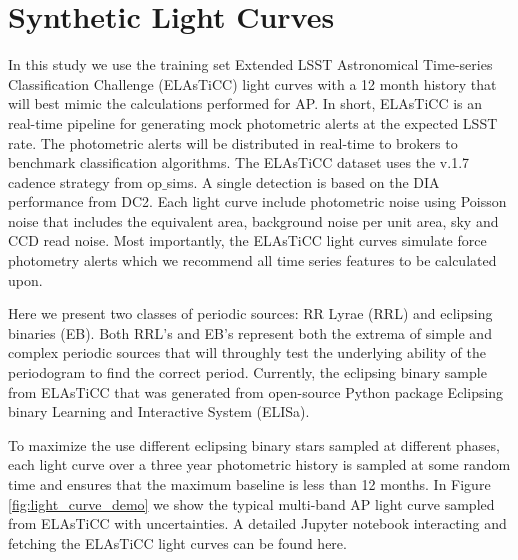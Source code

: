\documentclass[DM,authoryear,toc]{lsstdoc}
\begin{document}
\section{Synthetic Light Curves}
In this study we use the training set Extended LSST Astronomical Time-series Classification Challenge (ELAsTiCC) light curves with a 12 month history that will best mimic the calculations performed for AP. In short, ELAsTiCC is an real-time pipeline for generating mock photometric alerts at the expected LSST rate. The photometric alerts will be distributed in real-time to brokers to benchmark classification algorithms. The ELAsTiCC dataset uses the v.1.7 cadence strategy from op$\_$sims. A single detection is based on the DIA performance from DC2. Each light curve include photometric noise using Poisson noise that includes the equivalent area, background noise per unit area, sky and CCD read noise. Most importantly, the ELAsTiCC light curves simulate force photometry alerts which we recommend all time series features to be calculated upon. 
	
	Here we present two classes of periodic sources: RR Lyrae (RRL) and eclipsing binaries (EB). Both RRL's and EB's represent both the extrema of simple and complex periodic sources that will throughly test the underlying ability of the periodogram to find the correct period. Currently, the eclipsing binary sample from ELAsTiCC that was generated from open-source Python package Eclipsing binary Learning and Interactive System (ELISa). 
	
	
	
	To maximize the use different eclipsing binary stars sampled at different phases, each light curve over a three year photometric history is sampled at some random time and ensures that the maximum baseline is less than 12 months. In Figure \ref{fig:light_curve_demo} we show the typical multi-band AP light curve sampled from ELAsTiCC with uncertainties. A detailed Jupyter notebook interacting and fetching the ELAsTiCC light curves can be found here. 
\end{document}
